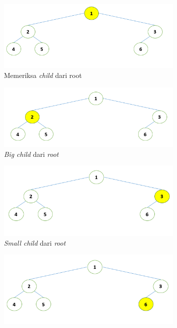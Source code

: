\begin{figure}[H]
	\begin{subfigure}{.5\textwidth}
		\centering
		\includegraphics[scale=0.36]{assets/images/Ilustrasi_proses_1.PNG}
		\caption{Memeriksa \textit{child} dari root}
		\label{fig:subproses1}
	\end{subfigure}
	\begin{subfigure}{.5\textwidth}
		\centering
		\includegraphics[scale=0.36]{assets/images/Ilustrasi_proses_2.PNG}
		\caption{\textit{Big child} dari \textit{root}}
		\label{fig:subproses2}
	\end{subfigure}
	\begin{subfigure}{.5\textwidth}
		\centering
		\includegraphics[scale=0.36]{assets/images/Ilustrasi_proses_3.PNG}
		\caption{\textit{Small child} dari \textit{root}}
		\label{fig:subproses3}
	\end{subfigure}
	\begin{subfigure}{.5\textwidth}
		\centering
		\includegraphics[scale=0.36]{assets/images/Ilustrasi_proses_4.PNG}

\end{subfigure}
\end{figure}
